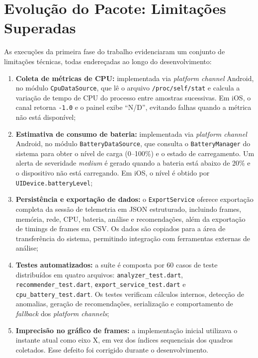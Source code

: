 \section{Evolução do Pacote: Limitações Superadas}

As execuções da primeira fase do trabalho evidenciaram um conjunto de limitações técnicas, todas endereçadas ao longo do desenvolvimento:

\begin{enumerate}
  \item \textbf{Coleta de métricas de CPU:} implementada via \textit{platform channel} Android, no módulo \texttt{CpuDataSource}, que lê o arquivo \texttt{/proc/self/stat} e calcula a variação de tempo de CPU do processo entre amostras sucessivas. Em iOS, o canal retorna \texttt{-1.0} e o painel exibe ``N/D'', evitando falhas quando a métrica não está disponível;

  \item \textbf{Estimativa de consumo de bateria:} implementada via \textit{platform channel} Android, no módulo \texttt{BatteryDataSource}, que consulta o \texttt{BatteryManager} do sistema para obter o nível de carga (0--100\%) e o estado de carregamento. Um alerta de severidade \textit{medium} é gerado quando a bateria está abaixo de 20\% e o dispositivo não está carregando. Em iOS, o nível é obtido por \texttt{UIDevice.batteryLevel};

  \item \textbf{Persistência e exportação de dados:} o \texttt{ExportService} oferece exportação completa da sessão de telemetria em JSON estruturado, incluindo frames, memória, rede, CPU, bateria, análise e recomendações, além da exportação de timings de frames em CSV. Os dados são copiados para a área de transferência do sistema, permitindo integração com ferramentas externas de análise;

  \item \textbf{Testes automatizados:} a suíte é composta por 60 casos de teste distribuídos em quatro arquivos: \texttt{analyzer\_test.dart}, \texttt{recommender\_test.dart}, \texttt{export\_service\_test.dart} e \texttt{cpu\_battery\_test.dart}. Os testes verificam cálculos internos, detecção de anomalias, geração de recomendações, serialização e comportamento de \textit{fallback} dos \textit{platform channels};

  \item \textbf{Imprecisão no gráfico de frames:} a implementação inicial utilizava o instante atual como eixo X, em vez dos índices sequenciais dos quadros coletados. Esse defeito foi corrigido durante o desenvolvimento.
\end{enumerate}


